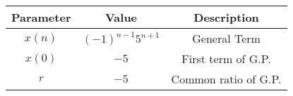 \begin{tabular}{|c|c|c|}
    \hline
     \textbf{Parameter} & \textbf{Value} &
     \textbf{Description}\\
    \hline 
     $x(n)$ &  $(-1)^{n-1}5^{n+1}$ & General Term\\
    \hline 
     $x(0)$ &  $-5$ & First term of G.P.\\
     
    \hline
     $r$ & $-5$ & Common ratio of G.P.  \\
      \hline
    
  
								      
\end{tabular}
